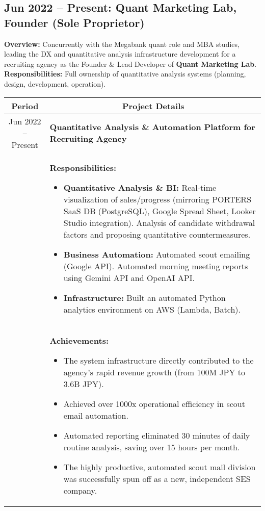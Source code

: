 \documentclass[uplatex,a4j,10.5pt,dvipdfmx]{jsarticle}
\newcommand{\textbfsubsection}[1]{\subsection*{\textbf{#1}}}
\begin{document}
\textbfsubsection{Jun 2022 -- Present: Quant Marketing Lab, Founder (Sole Proprietor)}
\noindent\textbf{Overview:} Concurrently with the Megabank quant role and MBA studies, leading the DX and quantitative analysis infrastructure development for a recruiting agency as the Founder \& Lead Developer of \textbf{Quant Marketing Lab}.
\noindent\textbf{Responsibilities:} Full ownership of quantitative analysis systems (planning, design, development, operation).
\begin{longtable}{|c|p{14cm}|}
	\hline
	\multicolumn{1}{|c|}{\textbf{Period}} & \multicolumn{1}{c|}{\textbf{Project Details}}                                             \\
	\hline
	\endhead
	\hline
	Jun 2022 -- Present                   & \textbf{\textbullet{} Quantitative Analysis \& Automation Platform for Recruiting Agency} \\
	                                      & {\small \textbf{Responsibilities:}}
	\begin{itemize}[leftmargin=*,noitemsep]
		\item \textbf{Quantitative Analysis \& BI:} Real-time visualization of sales/progress (mirroring PORTERS SaaS DB (PostgreSQL), Google Spread Sheet, Looker Studio integration). Analysis of candidate withdrawal factors and proposing quantitative countermeasures.
		\item \textbf{Business Automation:} Automated scout emailing (Google API). Automated morning meeting reports using Gemini API and OpenAI API.
		\item \textbf{Infrastructure:} Built an automated Python analytics environment on AWS (Lambda, Batch).
	\end{itemize}
	\\
	                                      & {\small \textbf{Achievements:}}
	\begin{itemize}[leftmargin=*,noitemsep]
		\item The system infrastructure directly contributed to the agency's rapid revenue growth (from 100M JPY to 3.6B JPY).
		\item Achieved over 1000x operational efficiency in scout email automation.
		\item Automated reporting eliminated 30 minutes of daily routine analysis, saving over 15 hours per month.
		\item The highly productive, automated scout mail division was successfully spun off as a new, independent SES company.
	\end{itemize}
	\\
	\hline
\end{longtable}
\end{document}
